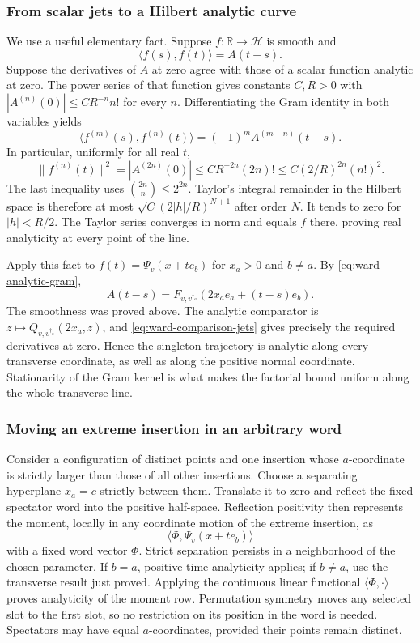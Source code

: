 \subsubsection{From scalar jets to a Hilbert analytic curve}

We use a useful elementary fact. Suppose $f:\mathbb R\to\mathcal H$ is
smooth and
\[
 \langle f(s),f(t)\rangle=A(t-s).
\]
Suppose the derivatives of $A$ at zero agree with those of a scalar
function analytic at zero. The power series of that function gives
constants $C,R>0$ with
$|A^{(n)}(0)|\leq C R^{-n}n!$ for every $n$. Differentiating the Gram
identity in both variables yields
\[
 \langle f^{(m)}(s),f^{(n)}(t)\rangle
                  =(-1)^m A^{(m+n)}(t-s).
\]
In particular, uniformly for all real $t$,
\[
 \|f^{(n)}(t)\|^2
    =|A^{(2n)}(0)|\leq C R^{-2n}(2n)!
    \leq C(2/R)^{2n}(n!)^2.
\]
The last inequality uses $\binom{2n}{n}\leq2^{2n}$.
Taylor's integral remainder in the Hilbert space is therefore at most
$\sqrt C(2|h|/R)^{N+1}$ after order $N$. It tends to zero for
$|h|<R/2$. The Taylor series converges in norm and equals $f$ there,
proving real analyticity at every point of the line.

Apply this fact to $f(t)=\Psi_v(x+te_b)$ for $x_a>0$ and $b\ne a$.
By \eqref{eq:ward-analytic-gram},
\[
 A(t-s)=F_{v,v^{\dagger_a}}
                  (2x_ae_a+(t-s)e_b).
\]
The smoothness was proved above. The analytic comparator is
$z\mapsto Q_{v,v^{\dagger_a}}(2x_a,z)$, and
\eqref{eq:ward-comparison-jets} gives precisely the required derivatives
at zero. Hence the singleton trajectory is analytic along every transverse
coordinate, as well as along the positive normal coordinate. Stationarity
of the Gram kernel is what makes the factorial bound uniform along the
whole transverse line.

\subsubsection{Moving an extreme insertion in an arbitrary word}

Consider a configuration of distinct points and one insertion whose
$a$-coordinate is strictly larger than those of all other insertions.
Choose a separating hyperplane $x_a=c$ strictly between them. Translate
it to zero and reflect the fixed spectator word into the positive
half-space. Reflection positivity then represents the moment, locally in
any coordinate motion of the extreme insertion, as
\[
 \langle\Phi,\Psi_v(x+te_b)\rangle
\]
with a fixed word vector $\Phi$. Strict separation persists in a
neighborhood of the chosen parameter. If $b=a$, positive-time analyticity
applies; if $b\ne a$, use the transverse result just proved. Applying the
continuous linear functional $\langle\Phi,\cdot\rangle$ proves
analyticity of the moment row. Permutation symmetry moves any selected
slot to the first slot, so no restriction on its position in the word is
needed. Spectators may have equal $a$-coordinates, provided their points
remain distinct.

